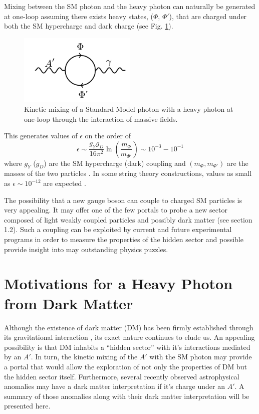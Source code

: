 Mixing between the SM photon and the heavy photon can naturally be 
generated at one-loop assuming there exists heavy states, ($\Phi$, $\Phi'$), 
that are charged under both the SM hypercharge and dark charge (see Fig. \ref{fig:ap_loop}).
\begin{figure}
    \centering
    \includegraphics[width=0.5\textwidth]{images/aprime_loop.png}
    \caption{Kinetic mixing of a Standard Model photon with a heavy photon 
    at one-loop through the interaction of massive fields.}
    \label{fig:ap_loop}
\end{figure}
This generates values of $\epsilon$ on the order of 
\begin{equation}
    \epsilon \sim \frac{g_Yg_D}{16\pi^2}\ln\left(\frac{m_{\Phi}}{m_{\Phi'}} \right)
             \sim 10^{-3} - 10^{-1} 
\end{equation}
where $g_Y$ ($g_D$) are the SM hypercharge (dark) coupling and 
$(m_{\Phi}, m_{\Phi'})$ are the masses of the two particles
\cite{arkani-hamed2008, Bjorken:2009mm}.  In some string theory constructions, 
values as small as $\epsilon \sim 10^{-12}$ are expected 
\cite{goodsell2010,Goodsell:2009xc, Cicoli:2011yh}.

%
%

The possibility that a new gauge boson can couple to charged SM particles is 
very appealing.  It may offer one of the few portals to probe a new sector 
composed of light weakly coupled particles and possibly dark matter
(see section 1.2).  Such a coupling can be exploited by current and future
experimental programs in order to measure the properties of
the hidden sector and possible provide insight into may outstanding physics puzzles.

\section{Motivations for a Heavy Photon from Dark Matter}

Although the existence of dark matter (DM) has been firmly established through its
gravitational interaction \cite{popolo2014}, its exact nature continues to elude
us. An appealing
possibility is that DM inhabits a ``hidden sector'' with it's interactions 
mediated by an $A'$.  In turn, the kinetic mixing of the $A'$ with the SM 
photon may provide a portal that would allow the exploration of not only the 
properties of DM but the hidden sector itself.  Furthermore, several recently
observed astrophysical anomalies \cite{pamela2008, ackermann2012, aguilar2013, 
hooper2011, linden2011, abazajian2012, hooper2013, Bulbul:2014sua}
may have a dark matter interpretation if it's
charge under an $A'$.  A summary of those anomalies along with their dark matter
interpretation will be presented here.

